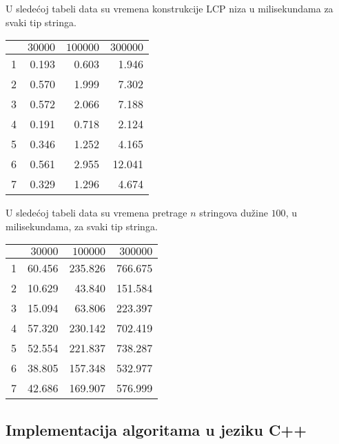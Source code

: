U slede\' coj tabeli data su vremena konstrukcije LCP niza u milisekundama za svaki tip stringa.

\begin{tabular}{r|r|r|r}
  & $30000$ & $100000$ & $300000$ \\
\hline
1 & 0.193 & 0.603 & 1.946  \\
\hline
2 & 0.570 & 1.999 & 7.302  \\
\hline
3 & 0.572 & 2.066 & 7.188  \\
\hline
4 & 0.191 & 0.718 & 2.124  \\
\hline
5 & 0.346 & 1.252 & 4.165  \\
\hline
6 & 0.561 & 2.955 & 12.041  \\
\hline
7 & 0.329 & 1.296 & 4.674  \\
\end{tabular}

U slede\' coj tabeli data su vremena pretrage $n$ stringova du\v zine $100$, u milisekundama, za svaki tip stringa.

\begin{tabular}{r|r|r|r}
  & $30000$ & $100000$ & $300000$ \\
\hline
1 & 60.456 & 235.826 & 766.675  \\
\hline
2 & 10.629 & 43.840 & 151.584  \\
\hline
3 & 15.094 & 63.806 & 223.397  \\
\hline
4 & 57.320 & 230.142 & 702.419  \\
\hline
5 & 52.554 & 221.837 & 738.287  \\
\hline
6 & 38.805 & 157.348 & 532.977  \\
\hline
7 & 42.686 & 169.907 & 576.999  \\
\end{tabular}

\subsection{Implementacija algoritama u jeziku C++}

